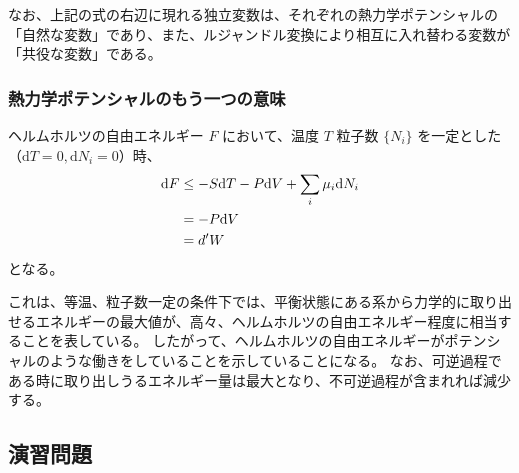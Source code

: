 \documentclass[uplatex,dvipdfmx,a4paper,11pt]{jsarticle}
\newcommand{\diff}{\mathrm d}
\begin{document}
なお、上記の式の右辺に現れる独立変数は、それぞれの熱力学ポテンシャルの「自然な変数」であり、また、ルジャンドル変換により相互に入れ替わる変数が「共役な変数」である。



\subsubsection{熱力学ポテンシャルのもう一つの意味}

ヘルムホルツの自由エネルギー $F$ において、温度 $T$ 粒子数 $\{N_i\}$ を一定とした（$\diff T =0, \diff N_i =0$）時、
\begin{align}
\diff F 
	&\leq -S \diff T -P\diff V + \sum_i \mu_i \diff N_i \notag \\
	&= -P \diff V \notag \\
	&= d' W
\end{align}
となる。

これは、等温、粒子数一定の条件下では、平衡状態にある系から力学的に取り出せるエネルギーの最大値が、高々、ヘルムホルツの自由エネルギー程度に相当することを表している。
したがって、ヘルムホルツの自由エネルギーがポテンシャルのような働きをしていることを示していることになる。
なお、可逆過程である時に取り出しうるエネルギー量は最大となり、不可逆過程が含まれれば減少する。


\subsection{演習問題}
\end{document}
